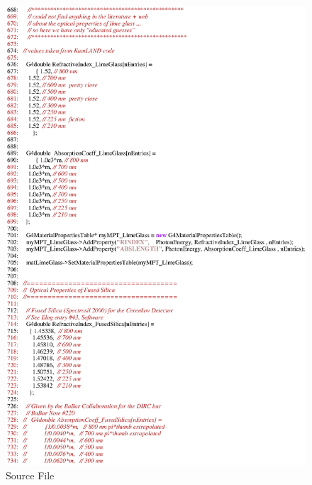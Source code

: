 \begin{figure}[h]
  \hspace{0cm}
  \includegraphics[scale=0.8]{./figures17/QweakSimMaterial.cc-p11.eps}
  \caption{\label{SourceXVII12} Source File}
           \label{fig:XVII-SC-12}
\end{figure}
\clearpage

